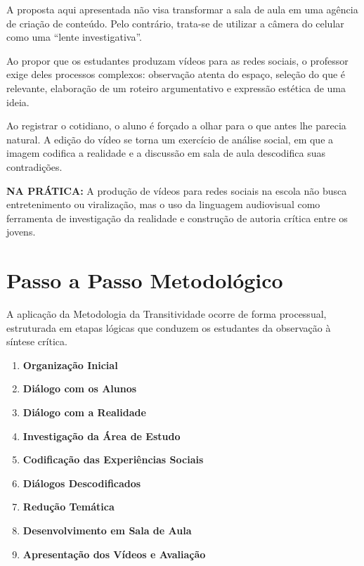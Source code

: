 \documentclass[
  letterpaper,
  DIV=11,
  numbers=noendperiod]{scrreport}
\begin{document}
A proposta aqui apresentada não visa transformar a sala de aula em uma
agência de criação de conteúdo. Pelo contrário, trata-se de utilizar a
câmera do celular como uma ``lente investigativa''.

Ao propor que os estudantes produzam vídeos para as redes sociais, o
professor exige deles processos complexos: observação atenta do espaço,
seleção do que é relevante, elaboração de um roteiro argumentativo e
expressão estética de uma ideia.

Ao registrar o cotidiano, o aluno é forçado a olhar para o que antes lhe
parecia natural. A edição do vídeo se torna um exercício de análise
social, em que a imagem codifica a realidade e a discussão em sala de
aula descodifica suas contradições.

\begin{tcolorbox}[enhanced jigsaw, arc=.35mm, bottomrule=.15mm, bottomtitle=1mm, breakable, colback=white, colbacktitle=quarto-callout-tip-color!10!white, colframe=quarto-callout-tip-color-frame, coltitle=black, left=2mm, leftrule=.75mm, opacityback=0, opacitybacktitle=0.6, rightrule=.15mm, title=\textcolor{quarto-callout-tip-color}{\faLightbulb}\hspace{0.5em}{Tip}, titlerule=0mm, toprule=.15mm, toptitle=1mm]

\textbf{NA PRÁTICA:} A produção de vídeos para redes sociais na escola
não busca entretenimento ou viralização, mas o uso da linguagem
audiovisual como ferramenta de investigação da realidade e construção de
autoria crítica entre os jovens.

\end{tcolorbox}


\chapter{Passo a Passo
Metodológico}\label{passo-a-passo-metodoluxf3gico}

A aplicação da Metodologia da Transitividade ocorre de forma processual,
estruturada em etapas lógicas que conduzem os estudantes da observação à
síntese crítica.

\begin{enumerate}
\def\labelenumi{\arabic{enumi}.}
\item
  \textbf{Organização Inicial}
\item
  \textbf{Diálogo com os Alunos}
\item
  \textbf{Diálogo com a Realidade}
\item
  \textbf{Investigação da Área de Estudo}
\item
  \textbf{Codificação das Experiências Sociais}
\item
  \textbf{Diálogos Descodificados}
\item
  \textbf{Redução Temática}
\item
  \textbf{Desenvolvimento em Sala de Aula}
\item
  \textbf{Apresentação dos Vídeos e Avaliação}
\end{enumerate}
\end{document}
